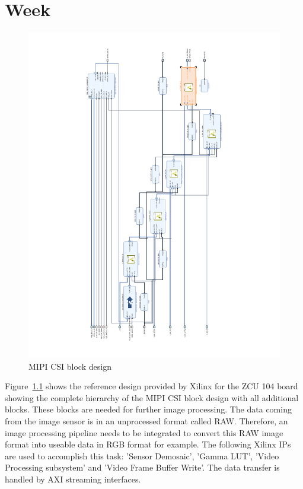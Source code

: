 \chapter{Week}
\begin{figure}[!htb]
	\centering
		\includegraphics[width=\textwidth]{bilder/mipi_csi2_rx.pdf}
		\caption{\acs{MIPI} \acs{CSI} block design}
		\label{fig:mipi_block}
\end{figure}
Figure~\ref{fig:mipi_block} shows the reference design provided by Xilinx for the ZCU 104 board showing the complete hierarchy of the \ac{MIPI} \ac{CSI} block design with all additional blocks. These blocks are needed for further image processing. The data coming from the image sensor is in an unprocessed format called RAW. Therefore, an image processing pipeline needs to be integrated to convert this RAW image format into useable data in RGB format for example. The following Xilinx \acp{IP} are used to accomplish this task: 'Sensor Demosaic', 'Gamma LUT', 'Video Processing subsystem' and 'Video Frame Buffer Write'. The data transfer is handled by \ac{AXI} streaming interfaces.

